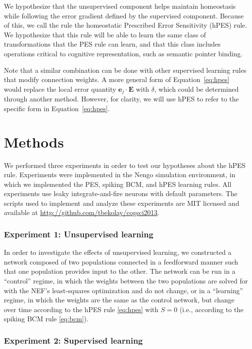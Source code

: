 \documentclass[10pt,letterpaper]{article}
\begin{document}
We hypothesize that the unsupervised
component helps maintain homeostasis
while following the error gradient defined
by the supervised component.
Because of this, we call the rule
the homeostatic Prescribed Error Sensitivity (hPES) rule.
We hypothesize that this rule will
be able to learn the same class
of transformations that the PES rule can learn,
and that this class includes operations
critical to cognitive representation,
such as semantic pointer binding.

Note that a similar combination can be done
with other supervised learning rules that
modify connection weights.
A more general form of Equation~\eqref{eq:hpes}
would replace the local error quantity
$\mathbf{e}_j \cdot \mathbf{E}$ with $\delta$,
which could be determined through another method.
However, for clarity, we will use hPES
to refer to the specific form in
Equation~\eqref{eq:hpes}.

\section{Methods}

We performed three experiments in order to
test our hypotheses about the hPES rule.
Experiments were implemented in the Nengo
simulation environment, in which we implemented
the PES, spiking BCM, and hPES learning rules.
All experiments use leaky integrate-and-fire
neurons with default parameters.
The scripts used to implement
and analyze these experiments
are MIT licensed and available at
\url{http://github.com/tbekolay/cogsci2013}.

\subsubsection{Experiment 1: Unsupervised learning}

In order to investigate the effects
of unsupervised learning,
we constructed a network composed of two populations
connected in a feedforward manner
such that one population provides input to the other.
The network can be run in a ``control'' regime,
in which the weights between the two populations
are solved for with the NEF's least-squares optimization
and do not change, or in a ``learning'' regime,
in which the weights are the same as the control network,
but change over time according to the hPES rule \eqref{eq:hpes}
with $S = 0$ (i.e., according to the spiking BCM rule \eqref{eq:bcm}).

\subsubsection{Experiment 2: Supervised learning}
\end{document}

